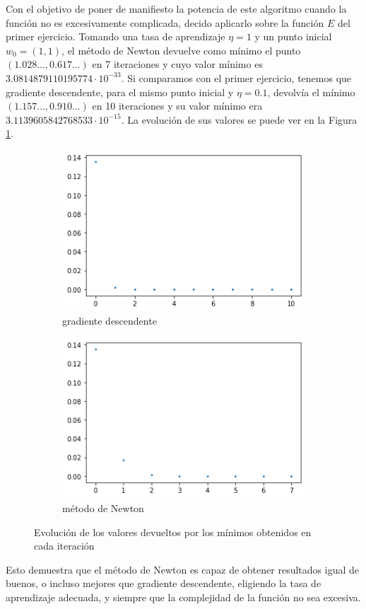 \documentclass[10pt,a4paper]{article}
\begin{document}
Con el objetivo de poner de manifiesto la potencia de este algoritmo cuando la función no es excesivamente complicada, decido aplicarlo sobre la función $E$ del primer ejercicio. Tomando una tasa de aprendizaje $\eta = 1$ y un punto inicial $w_0 = (1, 1)$, el método de Newton devuelve como mínimo el punto $(1.028 \dots, 0.617 \dots)$ en 7 iteraciones y cuyo valor mínimo es $3.0814879110195774 \cdot 10^{-33}$. Si comparamos con el primer ejercicio, tenemos que gradiente descendente, para el mismo punto inicial y $\eta = 0.1$, devolvía el mínimo $(1.157 \dots, 0.910 \dots)$ en 10 iteraciones y su valor mínimo era $3.1139605842768533 \cdot 10^{-15}$. La evolución de sus valores se puede ver en la Figura \ref{fig:bonus_evolucion_E}.

\begin{figure}[h]
	\begin{subfigure}{0.5\textwidth}
		\centering
		\includegraphics[width=\textwidth]{bonus_evolucion_E_gd}
		\caption{gradiente descendente}
	\end{subfigure}
	\begin{subfigure}{0.5\textwidth}
		\centering
		\includegraphics[width=\textwidth]{bonus_evolucion_E_newton}
		\caption{método de Newton}
	\end{subfigure}
	\caption{Evolución de los valores devueltos por los mínimos obtenidos en cada iteración}
	\label{fig:bonus_evolucion_E}
\end{figure}

Esto demuestra que el método de Newton es capaz de obtener resultados igual de buenos, o incluso mejores que gradiente descendente, eligiendo la tasa de aprendizaje adecuada, y siempre que la complejidad de la función no sea excesiva.
\end{document}
